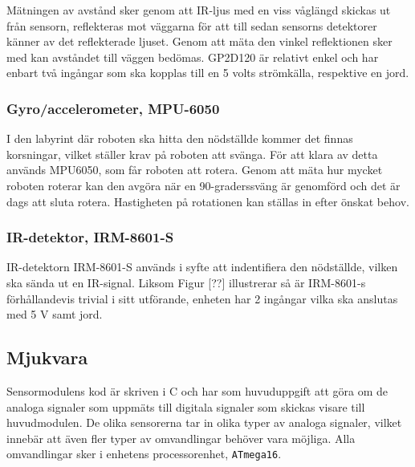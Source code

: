 \documentclass[11pt]{article}
\begin{document}
\begin{flushleft}
Mätningen av avstånd sker genom att IR-ljus med en viss våglängd skickas ut från sensorn, reflekteras mot väggarna för att till sedan sensorns detektorer känner av det reflekterade ljuset. Genom att mäta den vinkel reflektionen sker med kan avståndet till väggen bedömas. GP2D120 är relativt enkel och har enbart två ingångar som ska kopplas till en 5 volts strömkälla, respektive en jord. 

\subsubsection{Gyro/accelerometer, MPU-6050}
I den labyrint där roboten ska hitta den nödställde kommer det finnas korsningar, vilket ställer krav på roboten att svänga. För att klara av detta används MPU6050, som får roboten att rotera. Genom att mäta hur mycket roboten roterar kan den avgöra när en 90-graderssväng är genomförd och det är dags att sluta rotera. Hastigheten på rotationen kan ställas in efter önskat behov.
 
\subsubsection{IR-detektor, IRM-8601-S}
IR-detektorn IRM-8601-S används i syfte att indentifiera den nödställde, vilken ska sända ut en IR-signal. Liksom Figur [??] illustrerar så är IRM-8601-s förhållandevis trivial i sitt utförande, enheten har 2 ingångar vilka ska anslutas med 5 V samt jord. 



\subsection{Mjukvara}
Sensormodulens kod är skriven i C och har som huvuduppgift att göra om de analoga signaler som uppmäts till digitala signaler som skickas visare till huvudmodulen. De olika sensorerna tar in olika typer av analoga signaler, vilket innebär att även fler typer av omvandlingar behöver vara möjliga. Alla omvandlingar sker i enhetens processorenhet, \verb+ATmega16+. 


\end{flushleft}
\end{document}
